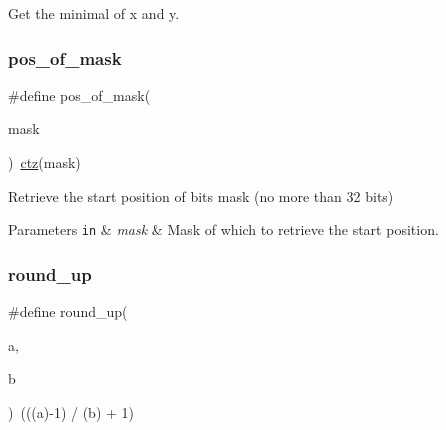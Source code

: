 Get the minimal of x and y. 

\mbox{\label{group__doc__driver__hal__utils__macro_ga6e6ec9c159cae4680d073d707063fa0e}} 
\subsubsection{\texorpdfstring{pos\+\_\+of\+\_\+mask}{pos\_of\_mask}}
{\footnotesize\ttfamily \#define pos\+\_\+of\+\_\+mask(\begin{DoxyParamCaption}\item[{}]{mask }\end{DoxyParamCaption})~\hyperlink{group__doc__driver__hal__utils__macro_gab069bfec305db5213465d3b689836404}{ctz}(mask)}



Retrieve the start position of bits mask (no more than 32 bits) 


\begin{DoxyParams}[1]{Parameters}
\mbox{\tt in}  & {\em mask} & Mask of which to retrieve the start position. \\
\hline
\end{DoxyParams}
\mbox{\label{group__doc__driver__hal__utils__macro_gab4181d52c8a5083a8f30e3063893f3da}} 
\subsubsection{\texorpdfstring{round\+\_\+up}{round\_up}}
{\footnotesize\ttfamily \#define round\+\_\+up(\begin{DoxyParamCaption}\item[{}]{a,  }\item[{}]{b }\end{DoxyParamCaption})~(((a)-\/1) / (b) + 1)}



